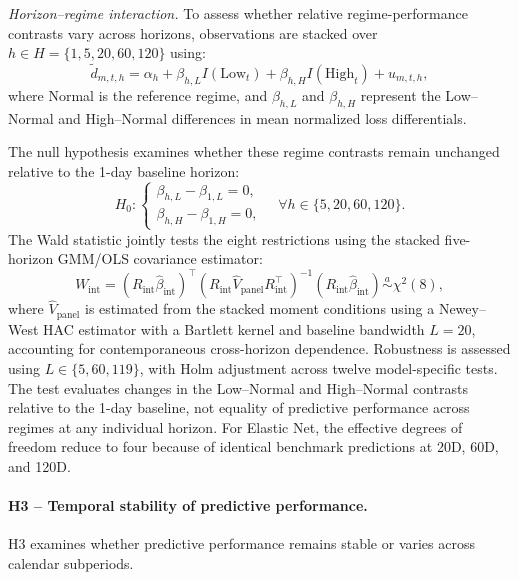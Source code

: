 \documentclass[runningheads,orivec]{llncs}
\begin{document}
\textit{Horizon--regime interaction.} To assess whether relative regime-performance contrasts vary across horizons, observations are stacked over $h\in H=\{1,5,20,60,120\}$ using:
\begin{equation}
\widetilde d_{m,t,h}
=
\alpha_h+\beta_{h,L}I(\mathrm{Low}_t)
+\beta_{h,H}I(\mathrm{High}_t)+u_{m,t,h},
\end{equation}
where Normal is the reference regime, and $\beta_{h,L}$ and $\beta_{h,H}$ represent the Low--Normal and High--Normal differences in mean normalized loss differentials.

The null hypothesis examines whether these regime contrasts remain unchanged relative to the 1-day baseline horizon:
\begin{equation}
H_0:
\begin{cases}
\beta_{h,L}-\beta_{1,L}=0,\\
\beta_{h,H}-\beta_{1,H}=0,
\end{cases}
\quad
\forall h\in\{5,20,60,120\}.
\end{equation}
The Wald statistic jointly tests the eight restrictions using the stacked five-horizon GMM/OLS covariance estimator:
\begin{equation}
W_{\mathrm{int}}
=
(R_{\mathrm{int}}\widehat\beta_{\mathrm{int}})^\top
\left(
R_{\mathrm{int}}\widehat V_{\mathrm{panel}}
R_{\mathrm{int}}^\top
\right)^{-1}
(R_{\mathrm{int}}\widehat\beta_{\mathrm{int}})
\overset{a}{\sim}\chi^2(8),
\end{equation}
where $\widehat V_{\mathrm{panel}}$ is estimated from the stacked moment conditions using a Newey--West HAC estimator with a Bartlett kernel and baseline bandwidth $L=20$, accounting for contemporaneous cross-horizon dependence. Robustness is assessed using $L\in\{5,60,119\}$, with Holm adjustment across twelve model-specific tests. The test evaluates changes in the Low--Normal and High--Normal contrasts relative to the 1-day baseline, not equality of predictive performance across regimes at any individual horizon. For Elastic Net, the effective degrees of freedom reduce to four because of identical benchmark predictions at 20D, 60D, and 120D.

\paragraph{H3 -- Temporal stability of predictive performance.} H3 examines whether predictive performance remains stable or varies across calendar subperiods.
\end{document}
